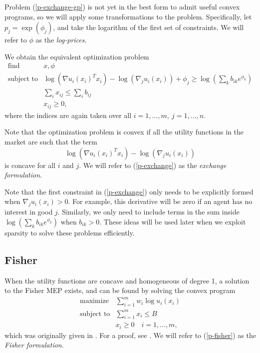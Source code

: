 \documentclass[12pt]{article}
\begin{document}
Problem (\ref{p-exchange-gp}) is not yet in the best form to admit useful
convex programs, so we will apply some transformations to the problem.
Specifically, let $p_j = \exp(\phi_j)$, and take the logarithm of the first set
of constraints. We will refer to $\phi$ as the \emph{log-prices}.

We obtain the equivalent optimization problem
\begin{equation}
\label{p-exchange}
\begin{array}{ll}
\mbox{find} & x, \phi \\
\mbox{subject to} & \log(\nabla u_i(x_i)^T x_i) - \log(\nabla_j u_i(x_i)) + \phi_j 
\geq \log(\sum_k b_{ik} e^{\phi_k})\\
& \sum_i x_{ij} \leq \sum_i b_{ij}\\
& x_{ij} \geq 0,
\end{array}
\end{equation}
where the indices are again taken over all $i=1,\ldots,m,\ j=1,\ldots,n$.

Note that the optimization problem is convex if all the utility functions
in the market are such that the term
\begin{equation}
\label{e-util-constraint}
\log(\nabla u_i(x_i)^T x_i) - \log(\nabla_j u_i(x_i))
\end{equation}
is concave for all $i$ and $j$.
We will refer to (\ref{p-exchange}) as the \emph{exchange formulation}.

Note that the first constraint in (\ref{p-exchange}) only needs to be
explicitly formed when $\nabla_j u_i(x_i) > 0$. For example, this derivative
will be zero if an agent has no interest in good $j$. Similarly, we only need
to include terms in the sum inside $\log(\sum_k b_{ik} e^{\phi_k})$ when
$b_{ik} > 0$. These ideas will be used later when we exploit sparsity to solve
these problems efficiently.

\subsection{Fisher}
\label{sec:convex_form_fisher}

When the utility functions are concave and homogeneous of degree 1,
a solution to the Fisher MEP exists,
and can be found by solving the convex program
\begin{equation}
\label{p-fisher}
\begin{array}{ll}
\mbox{maximize} & \sum_{i=1}^m w_i \log u_i(x_i) \\
\mbox{subject to} & \sum_{i=1}^m x_i \leq B\\
& x_i \geq 0\quad i=1,\ldots,m,
\end{array}
\end{equation}
which was originally given in \cite{eisenberg1959consensus, gale1960theory,
eisenberg1961aggregation}. For a proof, see \cite[\S6.2]{nisan2007algorithmic}.
We will refer to (\ref{p-fisher}) as the \emph{Fisher formulation}.
\end{document}
